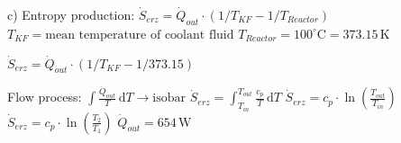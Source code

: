 c) Entropy production:  
\( \dot{S}_{erz} = \dot{Q}_{out} \cdot (1/T_{KF} - 1/T_{Reactor}) \)  
\( T_{KF} = \text{mean temperature of coolant fluid} \)  
\( T_{Reactor} = 100^\circ \text{C} = 373.15 \, \text{K} \)  

\( \dot{S}_{erz} = \dot{Q}_{out} \cdot (1/T_{KF} - 1/373.15) \)

Flow process:  
\( \int \frac{\dot{Q}_{out}}{T} \, \text{d}T \rightarrow \text{isobar} \)  
\( \dot{S}_{erz} = \int_{T_{in}}^{T_{out}} \frac{c_p}{T} \, \text{d}T \)  
\( \dot{S}_{erz} = c_p \cdot \ln \left( \frac{T_{out}}{T_{in}} \right) \)  
\( \dot{S}_{erz} = c_p \cdot \ln \left( \frac{T_{2}}{T_{1}} \right) \)  
\( \dot{Q}_{out} = 654 \, \text{W} \)